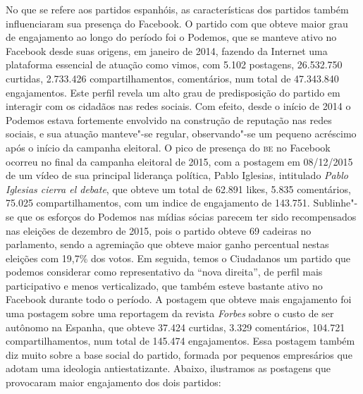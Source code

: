 No que se refere aos partidos espanhóis, as características dos partidos
também influenciaram sua presença do Facebook. O partido com que obteve
maior grau de engajamento ao longo do período foi o Podemos, que se
manteve ativo no Facebook desde suas origens, em janeiro de 2014,
fazendo da Internet uma plataforma essencial de atuação como vimos, com
5.102 postagens, 26.532.750 curtidas, 2.733.426 compartilhamentos,
comentários, num total de 47.343.840 engajamentos. Este perfil revela um
alto grau de predisposição do partido em interagir com os cidadãos nas
redes sociais. Com efeito, desde o início de 2014 o Podemos estava
fortemente envolvido na construção de reputação nas redes sociais, e sua
atuação manteve"-se regular, observando"-se um pequeno acréscimo após o
início da campanha eleitoral. O pico de presença do \textsc{be} no Facebook
ocorreu no final da campanha eleitoral de 2015, com a postagem em
08/12/2015 de um vídeo de sua principal liderança política, Pablo
Iglesias, intitulado \emph{Pablo Iglesias cierra el debate}, que obteve
um total de 62.891 likes, 5.835 comentários, 75.025 compartilhamentos,
com um indice de engajamento de 143.751. Sublinhe"-se que os esforços do
Podemos nas mídias sócias parecem ter sido recompensados nas eleições de
dezembro de 2015, pois o partido obteve 69 cadeiras no parlamento, sendo
a agremiação que obteve maior ganho percentual nestas eleições com
19,7\% dos votos. Em seguida, temos o Ciudadanos um partido que podemos
considerar como representativo da ``nova direita'', de perfil mais
participativo e menos verticalizado, que também esteve bastante ativo no
Facebook durante todo o período. A postagem que obteve mais engajamento
foi uma postagem sobre uma reportagem da revista \emph{Forbes} sobre o
custo de ser autônomo na Espanha, que obteve 37.424 curtidas, 3.329
comentários, 104.721 compartilhamentos, num total de 145.474
engajamentos. Essa postagem também diz muito sobre a base social do
partido, formada por pequenos empresários que adotam uma ideologia
antiestatizante. Abaixo, ilustramos as postagens que provocaram maior
engajamento dos dois partidos:




